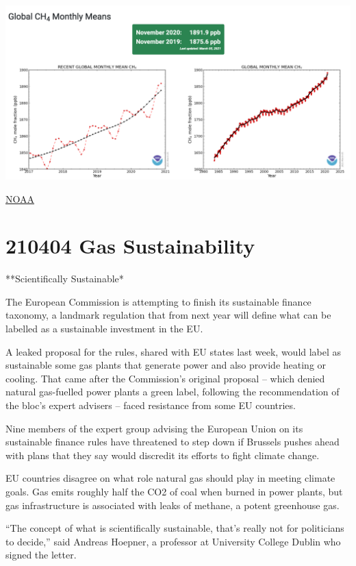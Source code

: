 \documentclass[
]{book}
\begin{document}
\includegraphics{fig/2020-global-ch4.png}

\href{https://research.noaa.gov/article/ArtMID/587/ArticleID/2742/Despite-pandemic-shutdowns-carbon-dioxide-and-methane-surged-in-2020}{NOAA}

\hypertarget{gas-sustainability}{%
\section{210404 Gas Sustainability}\label{gas-sustainability}}

**Scientifically Sustainable*

The European Commission is attempting to finish its sustainable finance taxonomy, a landmark regulation that from next year will define what can be labelled as a sustainable investment in the EU.

A leaked proposal for the rules, shared with EU states last week, would label as sustainable some gas plants that generate power and also provide heating or cooling. That came after the Commission's original proposal -- which denied natural gas-fuelled power plants a green label, following the recommendation of the bloc's expert advisers -- faced resistance from some EU countries.

Nine members of the expert group advising the European Union on its sustainable finance rules have threatened to step down if Brussels pushes ahead with plans that they say would discredit its efforts to fight climate change.

EU countries disagree on what role natural gas should play in meeting climate goals. Gas emits roughly half the CO2 of coal when burned in power plants, but gas infrastructure is associated with leaks of methane, a potent greenhouse gas.

``The concept of what is scientifically sustainable, that's really not for politicians to decide,'' said Andreas Hoepner, a professor at University College Dublin who signed the letter.
\end{document}
